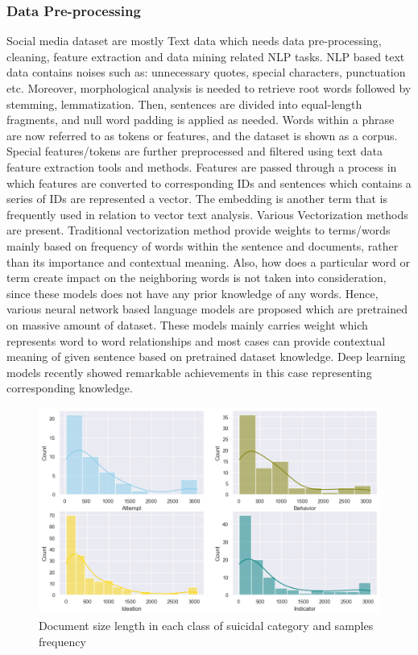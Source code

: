 \documentclass[sn-mathphys,Numbered]{sn-jnl}%
\theoremstyle{thmstyleone}%
\theoremstyle{thmstyletwo}%
\theoremstyle{thmstylethree}%
\begin{document}
\subsubsection{Data Pre-processing}\label{data_preprocessing}
Social media dataset are mostly Text data which needs data pre-processing, cleaning, feature extraction and data mining related NLP tasks. NLP based text data contains noises such as: unnecessary quotes, special characters, punctuation etc. Moreover, morphological analysis is needed to retrieve root words followed by stemming, lemmatization. Then, sentences are divided into equal-length fragments, and null word padding is applied as needed. Words within a phrase are now referred to as tokens or features, and the dataset is shown as a corpus. Special features/tokens are further preprocessed and filtered using text data feature extraction tools and methods. Features are passed through a process in which features are converted to corresponding IDs and sentences which contains a series of IDs are represented a vector. The embedding is another term that is frequently used in relation to vector text analysis. Various Vectorization methods are present. Traditional vectorization method provide weights to terms/words mainly based on frequency of words within the sentence and documents, rather than its importance and contextual meaning. Also, how does a particular word or term create impact on the neighboring words is not taken into consideration, since these models does not have any prior knowledge of any words. Hence, various neural network based language models are proposed which are pretrained on massive amount of dataset. These models mainly carries weight which represents word to word relationships and most cases can provide contextual meaning of given sentence based on pretrained dataset knowledge. Deep learning models recently showed remarkable achievements in this case representing corresponding knowledge.

\begin{figure}[h!]
\centering
\includegraphics[width=\textwidth]{document_size_length_in_each_class.png}
\caption{Document size length in each class of suicidal category and samples frequency}
\label{redditdist}
\end{figure}
\end{document}
